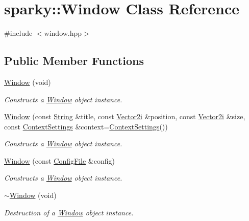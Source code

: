 \hypertarget{classsparky_1_1_window}{}\section{sparky\+:\+:Window Class Reference}
\label{classsparky_1_1_window}


{\ttfamily \#include $<$window.\+hpp$>$}

\subsection*{Public Member Functions}
\begin{DoxyCompactItemize}
\item 
\hyperlink{classsparky_1_1_window_a26b19857e3fe70b175a56696cafa9a44}{Window} (void)
\begin{DoxyCompactList}\small\item\em Constructs a \hyperlink{classsparky_1_1_window}{Window} object instance. \end{DoxyCompactList}\item 
\hyperlink{classsparky_1_1_window_a252dbb9b6884c1d7c0b8c1fa94ed203a}{Window} (const \hyperlink{classsparky_1_1_string}{String} \&title, const \hyperlink{classsparky_1_1_vector2}{Vector2i} \&position, const \hyperlink{classsparky_1_1_vector2}{Vector2i} \&size, const \hyperlink{structsparky_1_1_context_settings}{Context\+Settings} \&context=\hyperlink{structsparky_1_1_context_settings}{Context\+Settings}())
\begin{DoxyCompactList}\small\item\em Constructs a \hyperlink{classsparky_1_1_window}{Window} object instance. \end{DoxyCompactList}\item 
\hyperlink{classsparky_1_1_window_ab7f9473c65406574a916c83f0e51e3a2}{Window} (const \hyperlink{classsparky_1_1_config_file}{Config\+File} \&config)
\begin{DoxyCompactList}\small\item\em Constructs a \hyperlink{classsparky_1_1_window}{Window} object instance. \end{DoxyCompactList}\item 
\hyperlink{classsparky_1_1_window_afa2bde35c2f18a5aea594f686f1b5be7}{$\sim$\+Window} (void)
\begin{DoxyCompactList}\small\item\em Destruction of a \hyperlink{classsparky_1_1_window}{Window} object instance. \end{DoxyCompactList}\item 

\end{DoxyCompactItemize}
